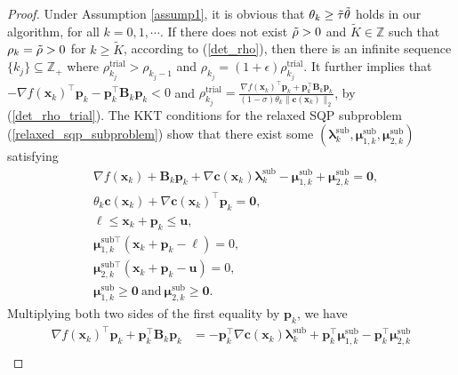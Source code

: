 \documentclass[aos]{imsart}
\numberwithin{equation}{section}
\theoremstyle{plain}
\begin{document}
\begin{appendix}
 \begin{proof}
     Under Assumption \ref{assump1}, it is obvious that $\theta_k \geq \Tilde{\tau} \Tilde{\theta}$ holds in our algorithm, for all $k=0,1, \cdots$. If there does not exist $\Tilde{\rho}>0$ and $\widetilde{K} \in \mathbb{Z}$ such that $\rho_k = \Tilde{\rho} > 0$ for $k \geq \widetilde{K}$, according to (\ref{det_rho}), then there is an infinite sequence $\{k_j\} \subseteq \mathbb{Z}_{+}$ where $\rho_{k_j}^{\text{trial}}  > \rho_{k_j-1}$ and $\rho_{k_j} = (1+\epsilon) \rho_{k_j}^{\text{trial}}$. It further implies that $-\nabla f(\bm{x}_k)^{\top} \bm{p}_k - \bm{p}_k^{\top} \bm{B}_k \bm{p}_k < 0$ and $\rho_{k_j}^{\text{trial}} = \frac{\nabla f(\bm{x}_k)^{\top} \bm{p}_k + \bm{p}_k^{\top} \bm{B}_k \bm{p}_k}{(1-\sigma)\theta_k \|\bm{c}(\bm{x}_k)\|_2}$, by (\ref{det_rho_trial}). The KKT conditions for the relaxed SQP subproblem (\ref{relaxed_sqp_subproblem}) show that
     there exist some $(\bm{\lambda}_k^{\text{sub}}, \bm{\mu}_{1,k}^{\text{sub}},\bm{\mu}_{2,k}^{\text{sub}})$ satisfying
     \begin{equation}
     \label{eq6}
         \begin{split}
             & \nabla f(\bm{x}_k) + \bm{B}_k \bm{p}_k + \nabla \bm{c}(\bm{x}_k) \bm{\lambda}_k^{\text{sub}} - \bm{\mu}_{1,k}^{\text{sub}} + \bm{\mu}_{2,k}^{\text{sub}} = \bm{0},\\
             & \theta_k \bm{c}(\bm{x}_{k})+ \nabla \bm{c}(\bm{x}_{k})^{\top}\bm{p}_k = \bm{0},\\
             & \bm{\ell} \leq \bm{x}_k + \bm{p}_k \leq \bm{u},\\
             & \bm{\mu}_{1,k}^{\text{sub} \top}(\bm{x}_k + \bm{p}_k - \bm{\ell}) = 0,\\
             & \bm{\mu}_{2,k}^{\text{sub} \top}(\bm{x}_k + \bm{p}_k - \bm{u}) = 0,\\
             & \bm{\mu}_{1,k}^{\text{sub}} \geq \bm{0}~\text{and}~ \bm{\mu}_{2,k}^{\text{sub}} \geq \bm{0}. 
         \end{split}
     \end{equation}
     Multiplying both two sides of the first equality by $\bm{p}_k$, we have
     \begin{equation*}
     \begin{split}
        \nabla f(\bm{x}_k)^{\top}\bm{p}_k + \bm{p}_k^{\top} \bm{B}_k \bm{p}_k & = -\bm{p}_k^{\top}\nabla \bm{c}(\bm{x}_k) \bm{\lambda}_k^{\text{sub}} + \bm{p}_k^{\top}\bm{\mu}_{1,k}^{\text{sub}} - \bm{p}_k^{\top}\bm{\mu}_{2,k}^{\text{sub}}\\

\end{split}
\end{equation*}
\end{proof}
\end{appendix}
\end{document}
